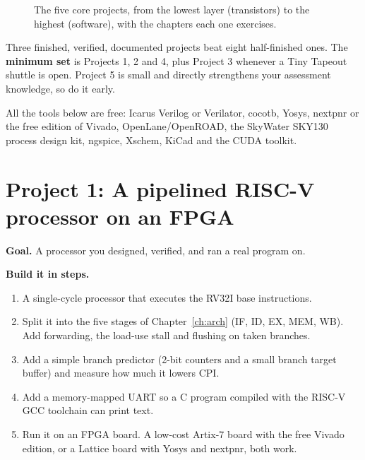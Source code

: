 \begin{figure}[h]
\centering
{}
\caption{The five core projects, from the lowest layer (transistors) to the highest (software), with the chapters each one exercises.}
\label{fig:projectstack}
\end{figure}

\begin{bigidea}
Three finished, verified, documented projects beat eight half-finished ones. The \textbf{minimum set} is Projects 1, 2 and 4, plus Project 3 whenever a Tiny Tapeout shuttle is open. Project 5 is small and directly strengthens your assessment knowledge, so do it early.
\end{bigidea}

All the tools below are free: Icarus Verilog or Verilator, cocotb, Yosys, nextpnr or the free edition of Vivado, OpenLane/OpenROAD, the SkyWater SKY130 process design kit, ngspice, Xschem, KiCad and the CUDA toolkit.

\section{Project 1: A pipelined RISC-V processor on an FPGA}

\textbf{Goal.} A processor you designed, verified, and ran a real program on.

\textbf{Build it in steps.}
\begin{enumerate}
  \item A single-cycle processor that executes the RV32I base instructions.
  \item Split it into the five stages of Chapter~\ref{ch:arch} (IF, ID, EX, MEM, WB). Add forwarding, the load-use stall and flushing on taken branches.
  \item Add a simple branch predictor (2-bit counters and a small branch target buffer) and measure how much it lowers CPI.
  \item Add a memory-mapped UART so a C program compiled with the RISC-V GCC toolchain can print text.
  \item Run it on an FPGA board. A low-cost Artix-7 board with the free Vivado edition, or a Lattice board with Yosys and nextpnr, both work.
\end{enumerate}


